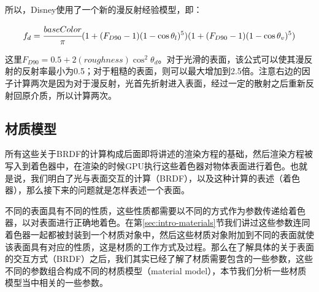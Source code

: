


所以，Disney使用了一个新的漫反射经验模型，即：

\begin{equation}\label{eq:intro-Disney-diff}
	f_d= \cfrac{baseColor}{\pi}(1+(F_{D90}-1)(1-\cos\theta_l)^5)(1+(F_{D90}-1)(1-\cos\theta_v)^5)
\end{equation} 

\noindent 这里$F_{D90}=0.5+2(roughness) \cos^2\theta_d$。对于光滑的表面，该公式可以使其漫反射的反射率最小为0.5；对于粗糙的表面，则可以最大增加到2.5倍。注意右边的因子计算两次是因为对于漫反射，光首先折射进入表面，经过一定的散射之后重新反射回原介质，所以计算两次。





\subsection{材质模型}\label{sec:intro-material-model}
所有这些关于BRDF的计算构成后面即将讲述的渲染方程的基础，然后渲染方程被写入到着色器中，在渲染的时候GPU执行这些着色器对物体表面进行着色。也就是说，我们明白了光与表面交互的计算（BRDF），以及这种计算的表述（着色器），那么接下来的问题就是怎样表述一个表面。

不同的表面具有不同的性质，这些性质都需要以不同的方式作为参数传递给着色器，以对表面进行正确地着色。在第\ref{sec:intro-materials}节我们讲过这些参数连同着色器一起都被封装到一个材质对象中，然后这些材质对象附加到不同的表面就使该表面具有对应的性质，这是材质的工作方式及过程。那么在了解具体的关于表面的交互方式（BRDF）之后，我们其实已经了解了材质需要包含的一些参数，这些不同的参数组合构成不同的材质模型（material model），本节我们分析一些材质模型当中相关的一些参数。

